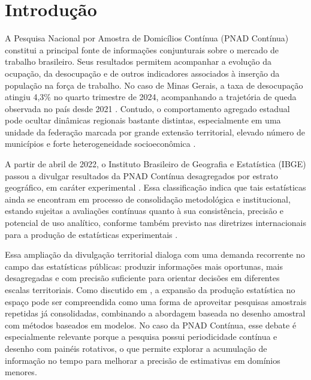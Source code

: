 \documentclass[rbe,wwwview]{econbr}
\begin{document}

\section{Introdução}\label{sec:Introdução}

A Pesquisa Nacional por Amostra de Domicílios Contínua (PNAD Contínua) constitui a principal fonte de informações conjunturais sobre o mercado de trabalho brasileiro. Seus resultados permitem acompanhar a evolução da ocupação, da desocupação e de outros indicadores associados à inserção da população na força de trabalho. No caso de Minas Gerais, a taxa de desocupação atingiu 4,3\% no quarto trimestre de 2024, acompanhando a trajetória de queda observada no país desde 2021 \citep{ibge2025pnad}. Contudo, o comportamento agregado estadual pode ocultar dinâmicas regionais bastante distintas, especialmente em uma unidade da federação marcada por grande extensão territorial, elevado número de municípios e forte heterogeneidade socioeconômica \citep{ibgecidades}.

A partir de abril de 2022, o Instituto Brasileiro de Geografia e Estatística (IBGE) passou a divulgar resultados da PNAD Contínua desagregados por estrato geográfico, em caráter experimental \citep{ibge_estratos,ibge_experimental}. Essa classificação indica que tais estatísticas ainda se encontram em processo de consolidação metodológica e institucional, estando sujeitas a avaliações contínuas quanto à sua consistência, precisão e potencial de uso analítico, conforme também previsto nas diretrizes internacionais para a produção de estatísticas experimentais \citep{eurostat_experimental}.

Essa ampliação da divulgação territorial dialoga com uma demanda recorrente no campo das estatísticas públicas: produzir informações mais oportunas, mais desagregadas e com precisão suficiente para orientar decisões em diferentes escalas territoriais. Como discutido em \citet{goncalves2023tese}, a expansão da produção estatística no espaço pode ser compreendida como uma forma de aproveitar pesquisas amostrais repetidas já consolidadas, combinando a abordagem baseada no desenho amostral com métodos baseados em modelos. No caso da PNAD Contínua, esse debate é especialmente relevante porque a pesquisa possui periodicidade contínua e desenho com painéis rotativos, o que permite explorar a acumulação de informação no tempo para melhorar a precisão de estimativas em domínios menores.
\end{document}
